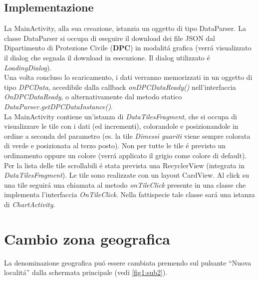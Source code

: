 \documentclass{article}
\newcommand{\quotes}[1]{``#1''}
\begin{document}
    \subsection{Implementazione}
    La MainActivity, alla sua creazione, istanzia un oggetto di tipo DataParser.
    La classe DataParser si occupa di eseguire il download dei file JSON dal Dipartimento di Protezione Civile (\textbf{DPC}) in modalitá grafica (verrá visualizzato il dialog che segnala il download in esecuzione. Il dialog utilizzato é \emph{LoadingDialog}).
    \\
    Una volta concluso lo scaricamento, i dati verranno memorizzati in un oggetto di tipo \emph{DPCData}, accedibile dalla callback \emph{onDPCDataReady()} nell'interfaccia \emph{OnDPCDataReady}, o alternativamente dal metodo statico \emph{DataParser.getDPCDataInstance()}.
    \\
    La MainActivity contiene un'istanza di \emph{DataTilesFragment}, che si occupa di visualizzare le tile con i dati (ed incrementi), colorandole e posizionandole in ordine a seconda del parametro 
    (es. la tile \emph{Dimessi guariti} viene sempre colorata di verde e posizionata al terzo posto). Non per tutte le tile é previsto un ordinamento oppure un colore (verrá applicato il grigio come colore di default).
    \\
    Per la lista delle tile scrollabili é stata prevista una RecyclerView (integrata in \emph{DataTilesFragment}). Le tile sono realizzate con un layout CardView.
    Al click su una tile seguirá una chiamata al metodo \emph{onTileClick} presente in una classe che implementa l'interfaccia \emph{OnTileClick}. Nella fattispecie tale classe sará una istanza di \emph{ChartActivity}.

    \section{Cambio zona geografica}
    La denominazione geografica puó essere cambiata premendo sul pulsante \quotes{Nuova localitá} dalla schermata principale (vedi \ref{fig1:sub2}).
    \\
\end{document}
